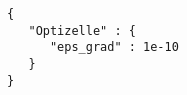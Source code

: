 \begin{lstlisting}[style=C++]
{
   "Optizelle" : {
      "eps_grad" : 1e-10
   }
}
\end{lstlisting}
